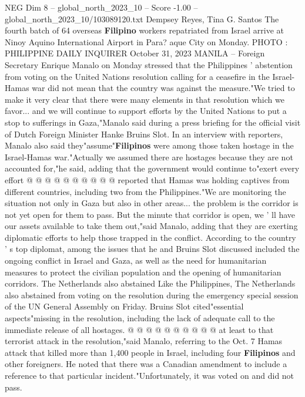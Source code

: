 \begin{textsample}{NEG Dim 8 – global\_north\_2023\_10 – Score -1.00 – global\_north\_2023\_10/103089120.txt}  \label{ex:f8_neg_247}
Dempsey Reyes, Tina G.
Santos The fourth batch of 64 overseas \textbf{Filipino} workers repatriated from Israel arrive at Ninoy Aquino International Airport in Para? aque City on Monday.
PHOTO : PHILIPPINE DAILY INQUIRER October 31, 2023 MANILA -- Foreign Secretary Enrique Manalo on Monday stressed that the Philippines ' abstention from voting on the United Nations resolution calling for a ceasefire in the Israel-Hamas war did not mean that the country was against the measure."We tried to make it very clear that there were many elements in that resolution which we favor... and we will continue to support efforts by the United Nations to put a stop to sufferings in Gaza,"Manalo said during a press briefing for the official visit of Dutch Foreign Minister Hanke Bruins Slot.
In an interview with reporters, Manalo also said they"assume"\textbf{Filipinos} were among those taken hostage in the Israel-Hamas war."Actually we assumed there are hostages because they are not accounted for,"he said, adding that the government would continue to"exert every effort @ @ @ @ @ @ @ @ @ @ reported that Hamas was holding captives from different countries, including two from the Philippines."We are monitoring the situation not only in Gaza but also in other areas... the problem is the corridor is not yet open for them to pass.
But the minute that corridor is open, we ' ll have our assets available to take them out,"said Manalo, adding that they are exerting diplomatic efforts to help those trapped in the conflict.
According to the country ' s top diplomat, among the issues that he and Bruins Slot discussed included the ongoing conflict in Israel and Gaza, as well as the need for humanitarian measures to protect the civilian population and the opening of humanitarian corridors.
The Netherlands also abstained Like the Philippines, The Netherlands also abstained from voting on the resolution during the emergency special session of the UN General Assembly on Friday.
Bruins Slot cited"essential aspects"missing in the resolution, including the lack of adequate call to the immediate release of all hostages. @ @ @ @ @ @ @ @ @ @ at least to that terrorist attack in the resolution,"said Manalo, referring to the Oct. 7 Hamas attack that killed more than 1,400 people in Israel, including four \textbf{Filipinos} and other foreigners.
He noted that there was a Canadian amendment to include a reference to that particular incident."Unfortunately, it was voted on and did not pass.

\end{textsample}

